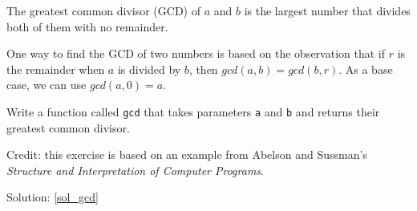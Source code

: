 \begin{exercise}
\label{gcd}

The greatest common divisor (GCD) of $a$ and $b$ is the largest number
that divides both of them with no remainder.  

One way to find the GCD of two numbers is based on the observation
that if $r$ is the remainder when $a$ is divided by $b$, then $gcd(a,
b) = gcd(b, r)$.  As a base case, we can use $gcd(a, 0) = a$.

Write a function called
\verb"gcd" that takes parameters {\tt a} and {\tt b}
and returns their greatest common divisor.

Credit: this exercise is based on an example from Abelson and
Sussman's {\em Structure and Interpretation of Computer Programs}.

Solution: \ref{sol_gcd}

\end{exercise}

